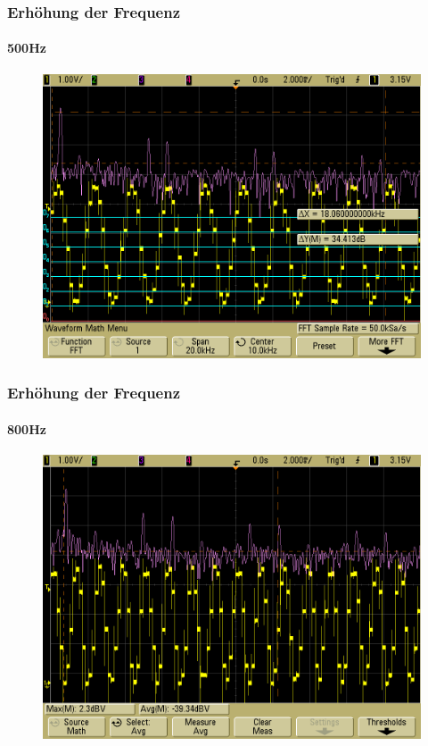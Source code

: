 \begin{frame}
    \frametitle{Erhöhung der Frequenz}
    \framesubtitle{500Hz}
            \begin{figure}[H]
            \begin{center}
                    \includegraphics[scale=0.2]{./img/oszi/scope_20.png}
            \end{center}
            \end{figure}
\end{frame}
\begin{frame}
    \frametitle{Erhöhung der Frequenz}
    \framesubtitle{800Hz}
            \begin{figure}[H]
            \begin{center}
                    \includegraphics[scale=0.2]{./img/oszi/scope_22.png}
            \end{center}
            \end{figure}
\end{frame}
